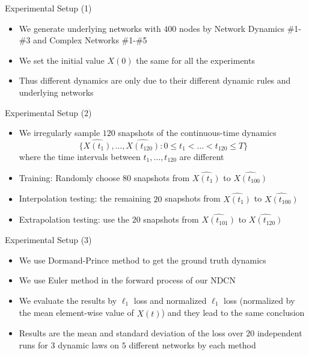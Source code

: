 \documentclass{beamer}
\begin{document}
\begin{frame}{Experimental Setup (1)}
\begin{itemize}
\item We generate underlying networks with $400$ nodes by Network Dynamics \#1-\#3 and Complex Networks \#1-\#5
\item We set the initial value $X(0)$ the same for all the experiments
\item Thus different dynamics are only due to their different dynamic rules and underlying networks
\end{itemize}
\end{frame}

\begin{frame}{Experimental Setup (2)}
\begin{itemize}
\item We irregularly sample $120$ snapshots of the continuous-time dynamics\[
\{\hat{X(t_1)},\dots,\hat{X(t_{120})}:0\leqslant t_1<\dots<t_{120}\leqslant T\}
\]where the time intervals between $t_1,\dots,t_{120}$ are different
\item Training: Randomly choose $80$ snapshots from $\hat{X(t_1)}$ to $\hat{X(t_{100})}$
\item Interpolation testing: the remaining $20$ snapshots from $\hat{X(t_1)}$ to $\hat{X(t_{100})}$
\item Extrapolation testing: use the $20$ snapshots from $\hat{X(t_{101})}$ to $\hat{X(t_{120})}$
\end{itemize}
\end{frame}

\begin{frame}{Experimental Setup (3)}
\begin{itemize}
\item We use Dormand-Prince method to get the ground truth dynamics
\item We use Euler method in the forward process of our NDCN
\item We evaluate the results by $\ell_1$ loss and normalized $\ell_1$ loss (normalized by the mean element-wise value of $\hat{X(t)}$) and they lead to the same conclusion
\item Results are the mean and standard deviation of the loss over $20$ independent runs for $3$ dynamic laws on $5$ different networks by each method
\end{itemize}
\end{frame}
\end{document}
